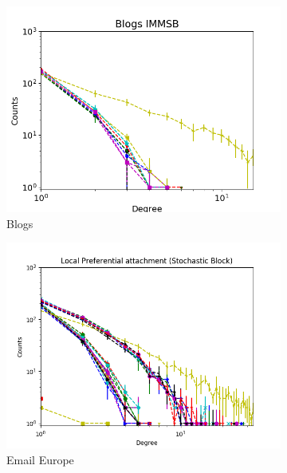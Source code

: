 \begin{figure}[h]
\begin{subfigure}[b]{0.300\textwidth}
            \includegraphics[width=\textwidth]{img/corpus/immsb_blogs_1}
            \caption {{\small Blogs}}    
            \label{fig:mean and std of net14}
        \end{subfigure}
        \begin{subfigure}[b]{0.300\textwidth}
            \centering
            \includegraphics[width=\textwidth]{img/corpus/immsb_emaileu_1}
            \caption {{\small Email Europe}}    
            \label{fig:mean and std of net14}
        \end{subfigure}
        \begin{subfigure}[b]{0.300\textwidth}
            \centering

\end{subfigure}
\end{figure}
